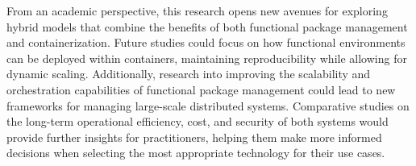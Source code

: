 From an academic perspective, this research opens new avenues for exploring hybrid models 
that combine the benefits of both functional package management and containerization. Future 
studies could focus on how functional environments can be deployed within containers, 
maintaining reproducibility while allowing for dynamic scaling. Additionally, research 
into improving the scalability and orchestration capabilities of functional package management 
could lead to new frameworks for managing large-scale distributed systems. Comparative studies 
on the long-term operational efficiency, cost, and security of both systems would provide 
further insights for practitioners, helping them make more informed decisions when selecting 
the most appropriate technology for their use cases.
